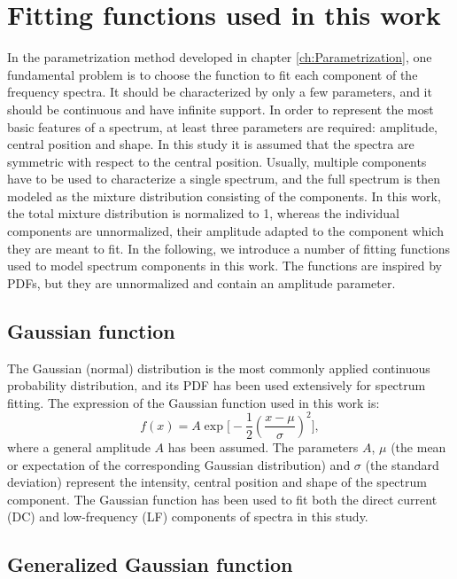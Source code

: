 \section{Fitting functions used in this work}

In the parametrization method developed in chapter \ref{ch:Parametrization}, one fundamental problem is to choose the function to fit each component of the frequency spectra. It should be characterized by only a few parameters, and it should be continuous and have infinite support. In order to represent the most basic features of a spectrum, at least three parameters are required: amplitude, central position and shape. In this study it is assumed that the spectra are symmetric with respect to the central position. Usually, multiple components have to be used to characterize a single spectrum, and the full spectrum is then modeled as the mixture distribution consisting of the components. In this work, the total mixture distribution is normalized to 1, whereas the individual components are unnormalized, their amplitude adapted to the component which they are meant to fit. In the following, we introduce a number of fitting functions used to model spectrum components in this work. The functions are inspired by PDFs, but they are unnormalized and contain an amplitude parameter.

\subsection*{Gaussian function}

The Gaussian (normal) distribution is the most commonly applied continuous probability distribution, and its PDF has been used extensively for spectrum fitting. The expression of the Gaussian function used in this work is:%
\begin{equation}
f(x) = A\exp\biggl[-\frac{1}{2}\left(\frac{x-\mu}{\sigma}\right)^2\biggr],
\label{eq:GD}
\end{equation}
\noindent where a general amplitude $A$ has been assumed. The parameters $A$, $\mu$ (the mean or expectation of the corresponding Gaussian distribution) and $\sigma$ (the standard deviation) represent the intensity, central position and shape of the spectrum component. The Gaussian function has been used to fit both the direct current (DC) and low-frequency (LF) components of spectra in this study.


\subsection*{Generalized Gaussian function}

